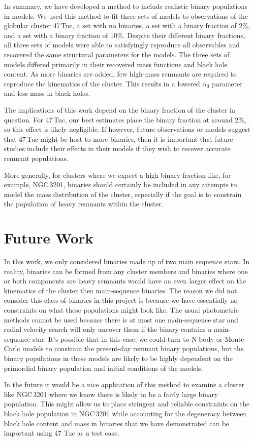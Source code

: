 


In summary, we have developed a method to include realistic binary populations in 
models. We used this method to fit three sets of models to observations of the globular cluster
47\,Tuc, a set with no binaries, a set with a binary fraction of $2\%$, and a set with a binary
fraction of $10\%$. Despite their different binary fractions, all three sets of models were able to
satisfyingly reproduce all observables and recovered the same structural parameters for the models.
The three sets of models differed primarily in their recovered mass functions and black hole
content. As more binaries are added, few high-mass remnants are required to reproduce the kinematics
of the cluster. This results in a lowered $\alpha_3$ parameter and less mass in black holes.

The implications of this work depend on the binary fraction of the cluster in question. For 47\,Tuc,
our best estimates place the binary fraction at around $2\%$, so this effect is likely negligible. If
however, future observations or models suggest that 47\,Tuc might be host to more binaries, then it
is important that future studies include their effects in their models if they wish to recover
accurate remnant populations.


More generally, for clusters where we expect a high binary fraction like, for example, NGC\,3201,
binaries should certainly be included in any attempts to model the mass distribution of the cluster,
especially if the goal is to constrain the population of heavy remnants within the cluster.



\section{Future Work}



In this work, we only considered binaries made up of two main sequence stars. In reality, binaries
can be formed from any cluster members and binaries where one or both components are heavy remnants
would have an even larger effect on the kinematics of the cluster then main-sequence binaries. The
reason we did not consider this class of binaries in this project is because we have essentially no
constraints on what these populations might look like. The usual photometric methods cannot be used
because there is at most one main-sequence star and radial velocity search will only uncover them if
the binary contains a main-sequence star. It's possible that in this case, we could turn to N-body
or Monte Carlo models to constrain the present-day remnant binary populations, but the binary
populations in these models are likely to be highly dependent on the primordial binary population
and initial conditions of the models.

In the future it would be a nice application of this method to examine a cluster like NGC\,3201
where we know there is likely to be a fairly large binary population. This might allow us to place
stringent and reliable constraints on the black hole population in NGC\,3201 while accounting for
the degeneracy between black hole content and mass in binaries that we have demonstrated can be
important using 47 Tuc as a test case.